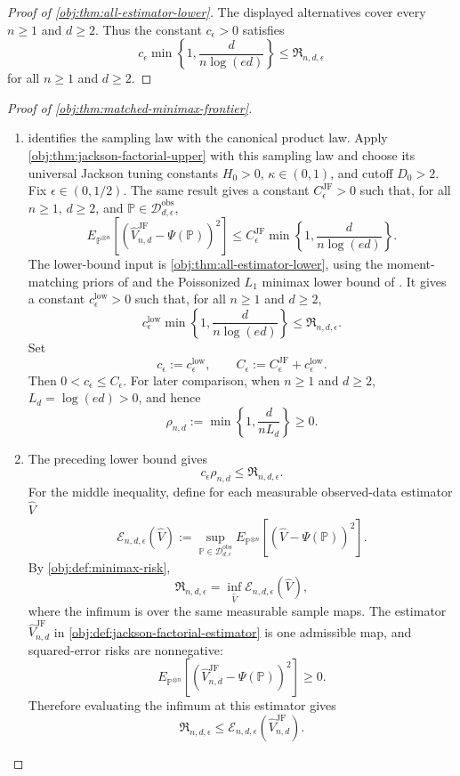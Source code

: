 \begin{proof}[Proof of \cref{obj:thm:all-estimator-lower}]
The displayed alternatives cover every \(n\ge1\) and \(d\ge2\).  Thus the
constant \(c_\epsilon>0\) satisfies
\[
c_\epsilon\min\left\{1,\frac{d}{n\log(ed)}\right\}
\le
\mathfrak R_{n,d,\epsilon}
\]
for all \(n\ge1\) and \(d\ge2\).
\end{proof}

\begin{proof}[Proof of \cref{obj:thm:matched-minimax-frontier}]
\begin{enumerate}
\item {} identifies the sampling law with the canonical product law.  Apply \cref{obj:thm:jackson-factorial-upper} with this sampling law and choose its universal Jackson tuning constants \(H_0>0\), \(\kappa\in(0,1)\), and cutoff \(D_0>2\).  Fix \(\epsilon\in(0,1/2)\).  The same result gives a constant \(C_{\epsilon}^{\mathrm{JF}}>0\) such that, for all \(n\ge1\), \(d\ge2\), and \(\mathbb P\in\mathcal D_{d,\epsilon}^{\mathrm{obs}}\),
\[
E_{\mathbb P^{\otimes n}}
\left[
  \left(\widehat V_{n,d}^{\mathrm{JF}}-\Psi(\mathbb P)\right)^2
\right]
\le
C_{\epsilon}^{\mathrm{JF}}
\min\left\{1,\frac{d}{n\log(ed)}\right\}.
\]
The lower-bound input is \cref{obj:thm:all-estimator-lower}, using the moment-matching priors of \citep[Lemma 1 and Section 3.1]{CaiLow2011L1} and the Poissonized \(L_1\) minimax lower bound of \citep[Theorem 3 and equation (24)]{JiaoHanWeissman2018L1}.  It gives a constant \(c_{\epsilon}^{\mathrm{low}}>0\) such that, for all \(n\ge1\) and \(d\ge2\),
\[
c_{\epsilon}^{\mathrm{low}}
\min\left\{1,\frac{d}{n\log(ed)}\right\}
\le
\mathfrak R_{n,d,\epsilon}.
\]
Set
\[
c_\epsilon:=c_{\epsilon}^{\mathrm{low}},
\qquad
C_\epsilon:=C_{\epsilon}^{\mathrm{JF}}+c_{\epsilon}^{\mathrm{low}} .
\]
Then \(0<c_\epsilon\le C_\epsilon\).  For later comparison, when \(n\ge1\) and \(d\ge2\), \(L_d=\log(ed)>0\), and hence
\[
\rho_{n,d}:=
\min\left\{1,\frac{d}{nL_d}\right\}\ge0 .
\]

\item The preceding lower bound gives
\[
c_\epsilon\rho_{n,d}\le \mathfrak R_{n,d,\epsilon}.
\]
For the middle inequality, define for each measurable observed-data estimator \(\widehat V\)
\[
\mathcal E_{n,d,\epsilon}(\widehat V)
:=
\sup_{\mathbb P\in\mathcal D_{d,\epsilon}^{\mathrm{obs}}}
E_{\mathbb P^{\otimes n}}
\left[
  \left(\widehat V-\Psi(\mathbb P)\right)^2
\right].
\]
By \cref{obj:def:minimax-risk},
\[
\mathfrak R_{n,d,\epsilon}
=
\inf_{\widehat V}\mathcal E_{n,d,\epsilon}(\widehat V),
\]
where the infimum is over the same measurable sample maps.  The estimator \(\widehat V_{n,d}^{\mathrm{JF}}\) in \cref{obj:def:jackson-factorial-estimator} is one admissible map, and squared-error risks are nonnegative:
\[
E_{\mathbb P^{\otimes n}}
\left[
  \left(\widehat V_{n,d}^{\mathrm{JF}}-\Psi(\mathbb P)\right)^2
\right]\ge0 .
\]
Therefore evaluating the infimum at this estimator gives
\[
\mathfrak R_{n,d,\epsilon}
\le
\mathcal E_{n,d,\epsilon}(\widehat V_{n,d}^{\mathrm{JF}}).
\]


\end{enumerate}
\end{proof}
